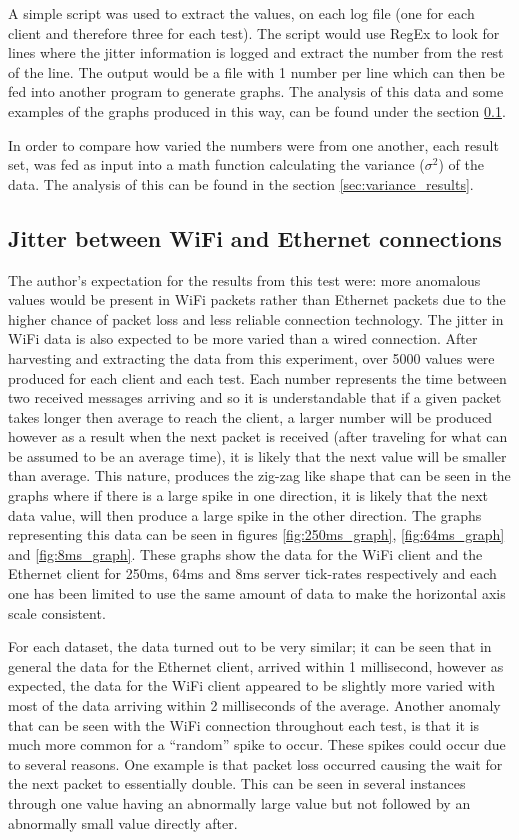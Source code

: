 A simple script was used to extract the values, on each log file (one for each client and therefore three for each test). The script would use RegEx to look for lines where the jitter information is logged and extract the number from the rest of the line. The output would be a file with 1 number per line which can then be fed into another program to generate graphs. The analysis of this data and some examples of the graphs produced in this way, can be found under the section \ref{sec:jitter_results}.

In order to compare how varied the numbers were from one another, each result set, was fed as input into a math function calculating the variance ($\sigma^2$) of the data. The analysis of this can be found in the section \ref{sec:variance_results}.

\newpage
\subsection{Jitter between WiFi and Ethernet connections} \label{sec:jitter_results}
The author's expectation for the results from this test were: more anomalous values would be present in WiFi packets rather than Ethernet packets due to the higher chance of packet loss and less reliable connection technology. The jitter in WiFi data is also expected to be more varied than a wired connection.
After harvesting and extracting the data from this experiment, over 5000 values were produced for each client and each test. Each number represents the time between two received messages arriving and so it is understandable that if a given packet takes longer then average to reach the client, a larger number will be produced however as a result when the next packet is received (after traveling for what can be assumed to be an average time), it is likely that the next value will be smaller than average. This nature, produces the zig-zag like shape that can be seen in the graphs where if there is a large spike in one direction, it is likely that the next data value, will then produce a large spike in the other direction. The graphs representing this data can be seen in figures \ref{fig:250ms_graph}, \ref{fig:64ms_graph} and \ref{fig:8ms_graph}. These graphs show the data for the WiFi client and the Ethernet client for 250ms, 64ms and 8ms server tick-rates respectively and each one has been limited to use the same amount of data to make the horizontal axis scale consistent.

For each dataset, the data turned out to be very similar; it can be seen that in general the data for the Ethernet client, arrived within 1 millisecond, however as expected, the data for the WiFi client appeared to be slightly more varied with most of the data arriving within 2 milliseconds of the average. Another anomaly that can be seen with the WiFi connection throughout each test, is that it is much more common for a ``random'' spike to occur. These spikes could occur due to several reasons. One example is that packet loss occurred causing the wait for the next packet to essentially double. This can be seen in several instances through one value having an abnormally large value but not followed by an abnormally small value directly after.

